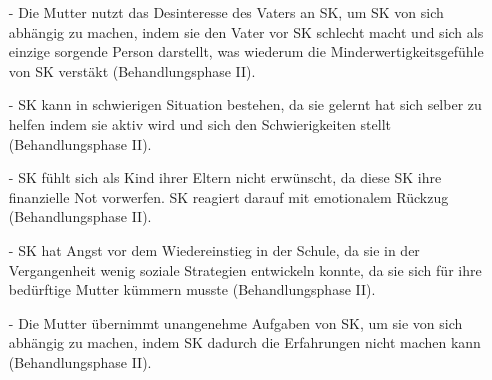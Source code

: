 \begin{itemize}
 \item [-] Die Mutter nutzt das Desinteresse des Vaters an SK, um SK von sich abhängig zu machen, indem sie den Vater vor SK schlecht macht und sich als einzige sorgende Person darstellt, was wiederum die Minderwertigkeitsgefühle von SK verstäkt (Behandlungsphase II).
 \item [-] SK kann in schwierigen Situation bestehen, da sie gelernt hat sich selber zu helfen indem sie aktiv wird und sich den Schwierigkeiten stellt (Behandlungsphase II).
 \item [-] SK fühlt sich als Kind ihrer Eltern nicht erwünscht, da diese SK ihre finanzielle Not vorwerfen. SK reagiert darauf mit emotionalem Rückzug (Behandlungsphase II).
 \item [-] SK hat Angst vor dem Wiedereinstieg in der Schule, da sie in der Vergangenheit wenig soziale Strategien entwickeln konnte, da sie sich für ihre bedürftige Mutter kümmern musste (Behandlungsphase II).
 \item [-] Die Mutter übernimmt unangenehme Aufgaben von SK, um sie von sich abhängig zu machen, indem SK dadurch die Erfahrungen nicht machen kann (Behandlungsphase II). 
\end{itemize}

